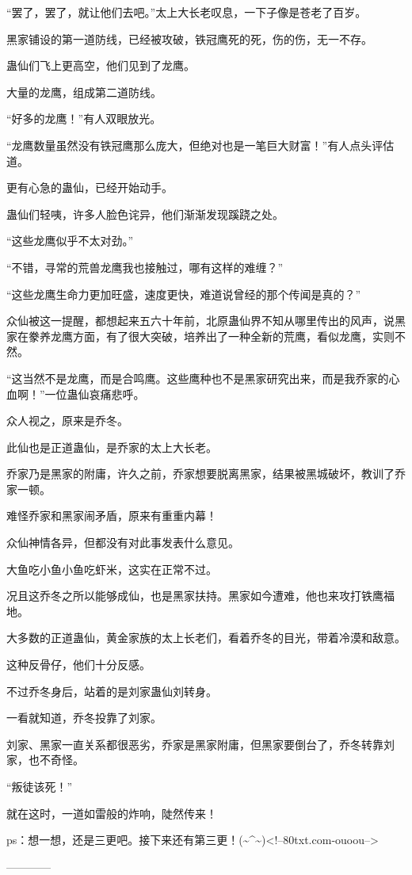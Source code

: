 \begin{this_body}
“罢了，罢了，就让他们去吧。”太上大长老叹息，一下子像是苍老了百岁。

黑家铺设的第一道防线，已经被攻破，铁冠鹰死的死，伤的伤，无一不存。

蛊仙们飞上更高空，他们见到了龙鹰。

大量的龙鹰，组成第二道防线。

“好多的龙鹰！”有人双眼放光。

“龙鹰数量虽然没有铁冠鹰那么庞大，但绝对也是一笔巨大财富！”有人点头评估道。

更有心急的蛊仙，已经开始动手。

蛊仙们轻咦，许多人脸色诧异，他们渐渐发现蹊跷之处。

“这些龙鹰似乎不太对劲。”

“不错，寻常的荒兽龙鹰我也接触过，哪有这样的难缠？”

“这些龙鹰生命力更加旺盛，速度更快，难道说曾经的那个传闻是真的？”

众仙被这一提醒，都想起来五六十年前，北原蛊仙界不知从哪里传出的风声，说黑家在豢养龙鹰方面，有了很大突破，培养出了一种全新的荒鹰，看似龙鹰，实则不然。

“这当然不是龙鹰，而是合鸣鹰。这些鹰种也不是黑家研究出来，而是我乔家的心血啊！”一位蛊仙哀痛悲呼。

众人视之，原来是乔冬。

此仙也是正道蛊仙，是乔家的太上大长老。

乔家乃是黑家的附庸，许久之前，乔家想要脱离黑家，结果被黑城破坏，教训了乔家一顿。

难怪乔家和黑家闹矛盾，原来有重重内幕！

众仙神情各异，但都没有对此事发表什么意见。

大鱼吃小鱼小鱼吃虾米，这实在正常不过。

况且这乔冬之所以能够成仙，也是黑家扶持。黑家如今遭难，他也来攻打铁鹰福地。

大多数的正道蛊仙，黄金家族的太上长老们，看着乔冬的目光，带着冷漠和敌意。

这种反骨仔，他们十分反感。

不过乔冬身后，站着的是刘家蛊仙刘转身。

一看就知道，乔冬投靠了刘家。

刘家、黑家一直关系都很恶劣，乔家是黑家附庸，但黑家要倒台了，乔冬转靠刘家，也不奇怪。

“叛徒该死！”

就在这时，一道如雷般的炸响，陡然传来！

ps：想一想，还是三更吧。接下来还有第三更！(\~{}\^{}\~{})<!--80txt.com-ouoou-->

------------

\end{this_body}

